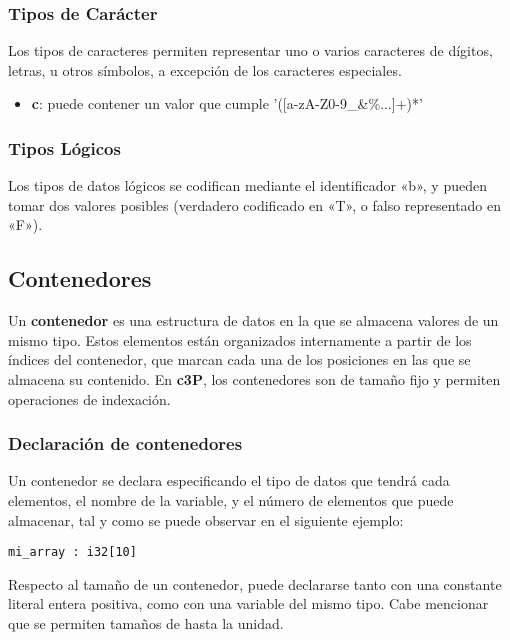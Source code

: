\subsubsection{Tipos de Carácter}

Los tipos de caracteres permiten representar uno o varios caracteres de dígitos,
letras, u otros símbolos, a excepción de los caracteres especiales.

\begin{itemize}
    \item \textbf{c}: puede contener un valor que cumple '([a-zA-Z0-9\+\-\_\&\%...]+)*'
\end{itemize}

\subsubsection{Tipos Lógicos}

Los tipos de datos lógicos se codifican mediante el identificador «b», y pueden tomar dos
valores posibles (verdadero codificado en «T», o falso representado en «F»).

\subsection{Contenedores}

Un \textbf{contenedor} es una estructura de datos en la que se almacena valores de un
mismo tipo. Estos elementos están organizados internamente a partir de los índices del
contenedor, que marcan cada una de los posiciones en las que se almacena su contenido.
En \textbf{c3P}, los contenedores son de tamaño fijo y permiten operaciones de indexación.

\subsubsection{Declaración de contenedores}

Un contenedor se declara especificando el tipo de datos que tendrá cada elementos,
el nombre de la variable, y el número de elementos que puede almacenar, tal y como
se puede observar en el siguiente ejemplo:

\begin{verbatim}
mi_array : i32[10]
\end{verbatim}

Respecto al tamaño de un contenedor, puede declararse tanto con una constante literal
entera positiva, como con una variable del mismo tipo. Cabe mencionar que se permiten
tamaños de hasta la unidad.

